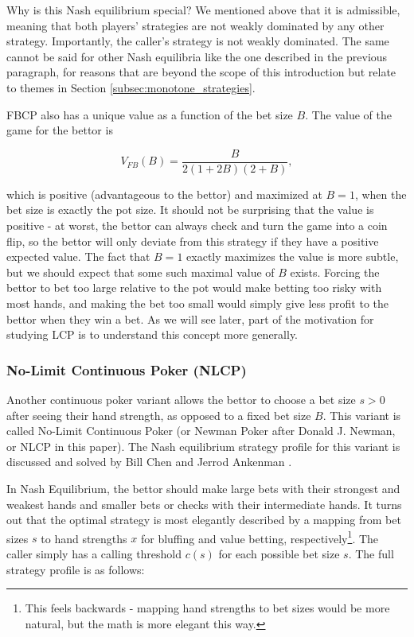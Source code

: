 \documentclass[../../main/main.tex]{subfiles}
\begin{document}
Why is this Nash equilibrium special? We mentioned above that it is admissible, meaning that both players' strategies are not weakly dominated by any other strategy. Importantly, the caller's strategy is not weakly dominated. The same cannot be said for other Nash equilibria like the one described in the previous paragraph, for reasons that are beyond the scope of this introduction but relate to themes in Section \ref{subsec:monotone_strategies}.

FBCP also has a unique value as a function of the bet size $B$. The value of the game for the bettor is 

$$ V_{FB}(B) = \frac{B}{2(1+2B)(2+B)}, $$

which is positive (advantageous to the bettor) and maximized at $B = 1$, when the bet size is exactly the pot size. It should not be surprising that the value is positive - at worst, the bettor can always check and turn the game into a coin flip, so the bettor will only deviate from this strategy if they have a positive expected value. The fact that $B=1$ exactly maximizes the value is more subtle, but we should expect that some such maximal value of $B$ exists. Forcing the bettor to bet too large relative to the pot would make betting too risky with most hands, and making the bet too small would simply give less profit to the bettor when they win a bet. As we will see later, part of the motivation for studying LCP is to understand this concept more generally.

\subsubsection{No-Limit Continuous Poker (NLCP)}
Another continuous poker variant allows the bettor to choose a bet size $s > 0$ after seeing their hand strength, as opposed to a fixed bet size $B$. This variant is called No-Limit Continuous Poker (or Newman Poker after Donald J. Newman, or NLCP in this paper). The Nash equilibrium strategy profile for this variant is discussed and solved by Bill Chen and Jerrod Ankenman \cite[p. 154]{chen2006mathematics}.

In Nash Equilibrium, the bettor should make large bets with their strongest and weakest hands and smaller bets or checks with their intermediate hands. It turns out that the optimal strategy is most elegantly described by a mapping from bet sizes $s$ to hand strengths $x$ for bluffing and value betting, respectively\footnote{This feels backwards - mapping hand strengths to bet sizes would be more natural, but the math is more elegant this way.}. The caller simply has a calling threshold $c(s)$ for each possible bet size $s$. The full strategy profile is as follows:
\end{document}
